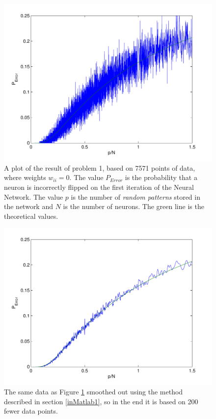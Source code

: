 \documentclass[12pt,a4paper]{article}
\begin{document}
\begin{figure}\centering
\includegraphics[width=12cm]{uppg1.pdf}
\caption{\label{uppg1} A plot of the result of problem 1, based on 7571
points of data, where weights $w_{ii} = 0$. The value $P_{Error}$ is the
probability that a neuron is incorrectly flipped on the first iteration of
the Neural Network.  The value $p$ is the number of \emph{random patterns}
stored in the network and $N$ is the number of neurons. The green line is
the theoretical values.}
\end{figure}

\begin{figure}\centering
\includegraphics[width=12cm]{uppg1_smooth.pdf}
\caption{\label{uppg1_smooth} The same data as Figure \ref{uppg1} smoothed out using the method described in section \ref{inMatlab1}, so in the end it is based on 200 fewer data points.}
\end{figure}
\end{document}
